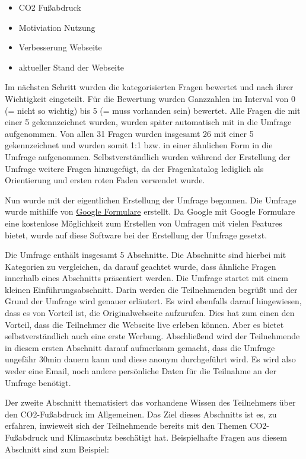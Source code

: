 \begin{itemize}
    \item CO2 Fußabdruck
    \item Motiviation Nutzung
    \item Verbesserung Webseite
    \item aktueller Stand der Webseite
\end{itemize}

Im nächsten Schritt wurden die kategorisierten Fragen bewertet und nach ihrer Wichtigkeit eingeteilt.
Für die Bewertung wurden Ganzzahlen im Interval von 0 (= nicht so wichtig) bis 5 (= muss vorhanden sein) bewertet.
Alle Fragen die mit einer 5 gekennzeichnet wurden, wurden später automatisch mit in die Umfrage aufgenommen.
Von allen 31 Fragen wurden insgesamt 26 mit einer 5 gekennzeichnet und wurden somit 1:1 bzw. in einer ähnlichen Form in die Umfrage aufgenommen.
Selbstverständlich wurden während der Erstellung der Umfrage weitere Fragen hinzugefügt, da der Fragenkatalog lediglich als Orientierung und ersten roten Faden verwendet wurde.\

Nun wurde mit der eigentlichen Erstellung der Umfrage begonnen.
Die Umfrage wurde mithilfe von \href{https://docs.google.com/forms/u/0/}{Google Formulare} erstellt.
Da Google mit Google Formulare eine kostenlose Möglichkeit zum Erstellen von Umfragen mit vielen Features bietet, wurde auf diese Software bei der Erstellung der Umfrage gesetzt.\

Die Umfrage enthält insgesamt 5 Abschnitte.
Die Abschnitte sind hierbei mit Kategorien zu vergleichen, da darauf geachtet wurde, dass ähnliche Fragen innerhalb eines Abschnitts präsentiert werden.
Die Umfrage startet mit einem kleinen Einführungsabschnitt.
Darin werden die Teilnehmenden begrüßt und der Grund der Umfrage wird genauer erläutert.
Es wird ebenfalls darauf hingewiesen, dass es von Vorteil ist, die Originalwebseite aufzurufen.
Dies hat zum einen den Vorteil, dass die Teilnehmer die Webseite live erleben können.
Aber es bietet selbstverständlich auch eine erste Werbung.
Abschließend wird der Teilnehmende in diesem ersten Abschnitt darauf aufmerksam gemacht, dass die Umfrage ungefähr 30min dauern kann und diese anonym durchgeführt wird.
Es wird also weder eine Email, noch andere persönliche Daten für die Teilnahme an der Umfrage benötigt.

Der zweite Abschnitt thematisiert das vorhandene Wissen des Teilnehmers über den CO2-Fußabdruck im Allgemeinen.
Das Ziel dieses Abschnitts ist es, zu erfahren, inwieweit sich der Teilnehmende bereits mit den Themen CO2-Fußabdruck und Klimaschutz beschätigt hat.
Beispielhafte Fragen aus diesem Abschnitt sind zum Beispiel:

